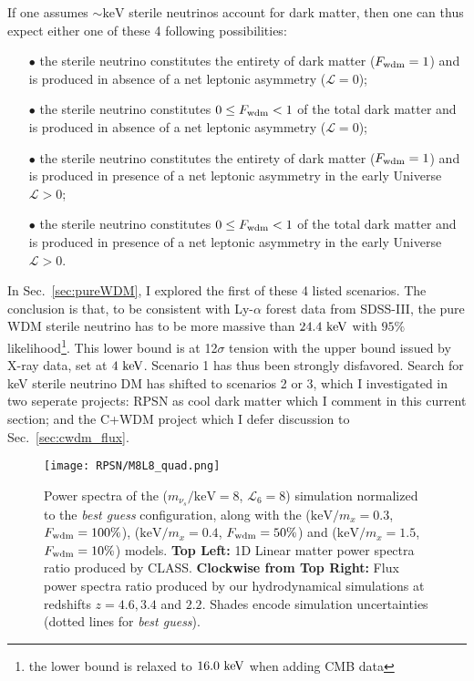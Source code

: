 If one assumes $\sim \mathrm{keV}$ sterile neutrinos account for dark matter, then one can thus expect either one of these 4 following possibilities: \\
\begin{itemize}
\item[$\bullet$] the sterile neutrino constitutes the entirety of dark matter ($F_{\rm{wdm}} = 1$) and is produced in absence of a net leptonic asymmetry ($\mathcal{L} = 0$);\\

\item[$\bullet$] the sterile neutrino constitutes $0 \leq F_{\rm{wdm}} < 1$ of the total dark matter and is produced in absence of a net leptonic asymmetry ($\mathcal{L} = 0$);\\

\item[$\bullet$] the sterile neutrino constitutes the entirety of dark matter ($F_{\rm{wdm}} = 1$) and is produced in presence of a net leptonic asymmetry in the early Universe $\mathcal{L} > 0$;\\

\item[$\bullet$] the sterile neutrino constitutes $0 \leq F_{\rm{wdm}} < 1$  of the total dark matter and is produced in presence of a net leptonic asymmetry in the early Universe $\mathcal{L} > 0$.\\
\end{itemize}

In Sec.~\ref{sec:pureWDM}, I explored the first of these 4 listed scenarios. The conclusion is that, to be consistent with Ly-$\alpha$ forest data from SDSS-III, the pure WDM sterile neutrino has to be more massive than $24.4~\rm{keV}$ with $95\%$ likelihood\footnote{the lower bound is relaxed to $16.0~\rm{keV}$ when adding CMB data}. This lower bound is at 12$\sigma$ tension with the upper bound issued by X-ray data, set at $4~\rm{keV}$. Scenario 1 has thus been strongly disfavored. Search for keV sterile neutrino DM has shifted to scenarios 2 or 3, which I investigated in two seperate projects: RPSN as cool dark matter which I comment in this current section; and the C+WDM project which I defer discussion to Sec.~\ref{sec:cwdm_flux}. \\

\begin{figure}
\begin{center}
\texttt{[image: RPSN/M8L8\_quad.png]}
\caption{Power spectra of the ($m_{\nu_s}/\mathrm{keV}=8$, $\mathcal{L}_6=8$) simulation normalized to the \textit{best guess} configuration, along with the ($\mathrm{keV}/m_x=0.3$, $F_{\rm{wdm}}=100\%$), ($\mathrm{keV}/m_x=0.4$, $F_{\rm{wdm}}=50\%$) and ($\mathrm{keV}/m_x=1.5$, $F_{\rm{wdm}}=10\%$) models. \textbf{Top Left:} 1D Linear matter power spectra ratio produced by \textsf{CLASS}. \textbf{Clockwise from Top Right:} Flux power spectra ratio produced by our hydrodynamical simulations at redshifts $z=4.6, 3.4$ and $2.2$. Shades encode simulation uncertainties (dotted lines for \textit{best guess}).}
\label{fig:flux}
\end{center}
\end{figure}


